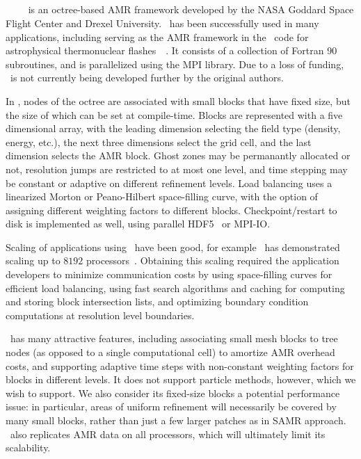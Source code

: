 \documentclass[10pt,twocolumn]{article}
\begin{document}
\subsection{\paramesh} \label{ss:paramesh}

\paramesh~\cite{MaOl00}~\cite{OlMa05}~\cite{Ol06}~\cite{wwwparamesh}
is an octree-based AMR framework developed by the NASA Goddard Space
Flight Center and Drexel University.  \paramesh\ has been successfully
used in many applications, including serving as the AMR framework in
the \flash\ code for astrophysical thermonuclear
flashes~\cite{FrOl00}~\cite{wwwflash}.  It consists of a collection of
Fortran 90 subroutines, and is parallelized using the MPI library.
Due to a loss of funding, \paramesh\ is not currently being developed
further by the original authors.

In \paramesh, nodes of the octree are associated with small blocks
that have fixed size, but the size of which can be set at
compile-time.  Blocks are represented with a five dimensional array,
with the leading dimension selecting the field type (density, energy,
etc.), the next three dimensions select the grid cell, and the last
dimension selects the AMR block.  Ghost zones may be permanantly
allocated or not, resolution jumps are restricted to at most one
level, and time stepping may be constant or adaptive on different
refinement levels.  Load balancing uses a linearized Morton or
Peano-Hilbert space-filling curve, with the option of assigning
different weighting factors to different blocks.  Checkpoint/restart
to disk is implemented as well, using parallel HDF5~\cite{hdf5} or
MPI-IO.

Scaling of applications using \paramesh\ have been good, for example
\flash\ has demonstrated scaling up to $8192$
processors~\cite{CoBe07}.  Obtaining this scaling required the
application developers to minimize communication costs by using
space-filling curves for efficient load balancing, using fast search
algorithms and caching for computing and storing block intersection
lists, and optimizing boundary condition computations at resolution
level boundaries.

\paramesh\ has many attractive features, including associating small
mesh blocks to tree nodes (as opposed to a single computational cell)
to amortize AMR overhead costs, and supporting adaptive time steps
with non-constant weighting factors for blocks in different levels.
It does not support particle methods, however, which we wish to
support.  We also consider its fixed-size blocks a potential
performance issue: in particular, areas of uniform refinement will
necessarily be covered by many small blocks, rather than just a few
larger patches as in SAMR approach.  \paramesh\ also replicates
AMR data on all processors, which will ultimately limit its scalability.
\end{document}
